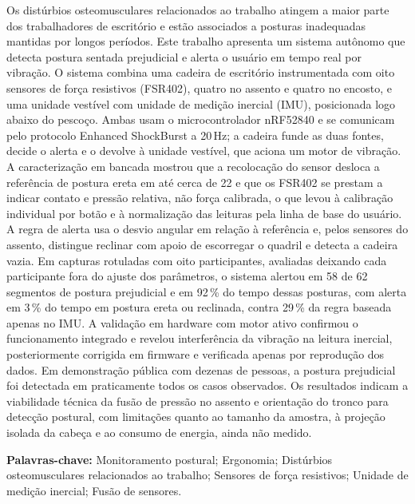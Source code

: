 \noindent
Os distúrbios osteomusculares relacionados ao trabalho atingem a maior parte dos
trabalhadores de escritório e estão associados a posturas inadequadas mantidas
por longos períodos. Este trabalho apresenta um sistema autônomo que detecta
postura sentada prejudicial e alerta o usuário em tempo real por vibração. O
sistema combina uma cadeira de escritório instrumentada com oito sensores de
força resistivos (FSR402), quatro no assento e quatro no encosto, e uma unidade
vestível com unidade de medição inercial (IMU), posicionada logo abaixo do
pescoço. Ambas usam o microcontrolador nRF52840 e se comunicam pelo protocolo
Enhanced ShockBurst a 20\,Hz; a cadeira funde as duas fontes, decide o alerta e
o devolve à unidade vestível, que aciona um motor de vibração. A caracterização
em bancada mostrou que a recolocação do sensor desloca a referência de postura
ereta em até cerca de 22\degree{} e que os FSR402 se prestam a indicar contato e
pressão relativa, não força calibrada, o que levou à calibração individual por
botão e à normalização das leituras pela linha de base do usuário. A regra de
alerta usa o desvio angular em relação à referência e, pelos sensores do
assento, distingue reclinar com apoio de escorregar o quadril e detecta a
cadeira vazia. Em capturas rotuladas com oito participantes, avaliadas deixando
cada participante fora do ajuste dos parâmetros, o sistema alertou em 58 de 62
segmentos de postura prejudicial e em 92\,\% do tempo dessas posturas, com
alerta em 3\,\% do tempo em postura ereta ou reclinada, contra 29\,\% da regra
baseada apenas no IMU. A validação em hardware com motor ativo confirmou o
funcionamento integrado e revelou interferência da vibração na leitura
inercial, posteriormente corrigida em firmware e verificada apenas por
reprodução dos dados. Em demonstração pública com
dezenas de pessoas, a postura prejudicial foi detectada em praticamente todos
os casos observados. Os resultados indicam a viabilidade técnica da fusão de
pressão no assento e orientação do tronco para detecção postural, com
limitações quanto ao tamanho da amostra, à projeção isolada da cabeça e ao
consumo de energia, ainda não medido.

\vspace{0.8em}
\noindent\textbf{Palavras-chave:} Monitoramento postural; Ergonomia; Distúrbios
osteomusculares relacionados ao trabalho; Sensores de força resistivos;
Unidade de medição inercial; Fusão de sensores.

\clearpage
